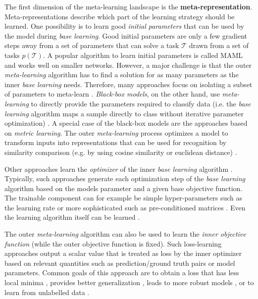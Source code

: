 The first dimension of the meta-learning landscape is the \textbf{meta-representation}.
Meta-representations describe which part of the learning strategy should be learned.
One possibility is to learn good \emph{initial parameters} that can be used by the model during \emph{base learning}.
Good initial parameters are only a few gradient steps away from a set of parameters that can solve a task $\mathcal{T}$ drawn from a set of tasks $p(\mathcal{T})$.
A popular algorithm to learn initial parameters is called MAML  and works well on smaller networks.
However, a major challenge is that the outer \emph{meta-learning} algorithm has to find a solution for as many parameters as the inner \emph{base learning} needs.
Therefore, many approaches focus on isolating a subset of parameters to meta-learn \cite{lee2018gradient, qiao2018few, rusu2018meta}.
\emph{Black-box models}, on the other hand, use \emph{meta-learning} to directly provide the parameters required to classify data (i.e. the \emph{base learning} algorithm maps a sample directly to class without iterative parameter optimization) \cite{heskes2000empirical, 10-5555-3454287-3455002, Ha_Dai_Le_2016}.
A special case of the black-box models are the approaches based on \emph{metric learning}.
The outer \emph{meta-learning} process optimizes a model to transform inputs into representations that can be used for recognition by similarity comparison (e.g. by using cosine similarity or euclidean distance) \cite{10-5555-3294996-3295163, qiao2018few, Chen_Liu_Kira_Wang_Huang_2020}.

Other approaches learn the \emph{optimizer} of the inner \emph{base learning} algorithm \cite{ravi2016optimization, Li_Malik_2016, Li_Zhou_Chen_Li_2017}.
Typically, such approaches generate each optimization step of the \emph{base learning} algorithm based on the models parameter and a given base objective function.
The trainable component can for example be simple hyper-parameters such as the learning rate \cite{Li_Zhou_Chen_Li_2017} or more sophisticated such as pre-conditioned matrices \cite{Park_Oliva_2020}.
Even the learning algorithm itself can be learned .

The outer \emph{meta-learning} algorithm can also be used to learn the \emph{inner objective function} (while the outer objective function is fixed).
Such loss-learning approaches output a scalar value that is treated as loss by the inner optimizer based on relevant quantities such as prediction/ground truth pairs or model parameters.
Common goals of this approach are to obtain a loss that has less local minima \cite{NEURIPS2018_7876acb6, Sung_Zhang_Xiang_Hospedales_Yang_2017}, provides better generalization \cite{NEURIPS2018_b9a25e42, NEURIPS2019_e0e2b58d, gonzalez2020improved}, leads to more robust models \cite{li2019feature}, or to learn from unlabelled data \cite{NEURIPS2019_6018df18, Boney2018SemiSupervisedFL}.

